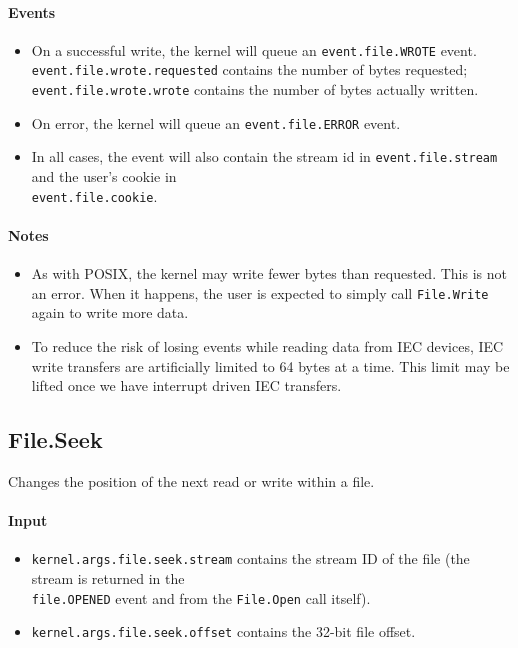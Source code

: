 \paragraph{Events}
\begin{itemize}
\item On a successful write, the kernel will queue an \verb+event.file.WROTE+ event. \\ \verb+event.file.wrote.requested+ contains the number of bytes requested; \\ \verb+event.file.wrote.wrote+ contains the number of bytes actually written.
\item On error, the kernel will queue an \verb+event.file.ERROR+ event.
\item In all cases, the event will also contain the stream id in \verb+event.file.stream+ and the user's cookie in \\ \verb+event.file.cookie+.
\end{itemize}

\paragraph{Notes}
\begin{itemize}
\item As with POSIX, the kernel may write fewer bytes than requested.  This is not an error.  When it happens, the user is expected to simply call \verb+File.Write+ again to write more data.

\item To reduce the risk of losing events while reading data from IEC devices, IEC write transfers are artificially limited to 64 bytes at a time.  This limit may be lifted once we have interrupt driven IEC transfers.
\end{itemize}

\subsection*{File.Seek}
Changes the position of the next read or write within a file.

\paragraph{Input}
\begin{itemize}
\item \verb+kernel.args.file.seek.stream+ contains the stream ID of the file (the stream is returned in the \\ \verb+file.OPENED+ event and from the \verb+File.Open+ call itself).
\item \verb+kernel.args.file.seek.offset+ contains the 32-bit file offset.
\end{itemize}

